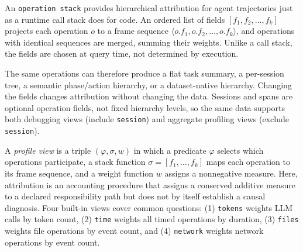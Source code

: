 \documentclass[letterpaper]{article}
\newcommand{\opstack}{\texttt{operation stack}\xspace}
\begin{document}
\label{sec:stacks}
An \opstack provides hierarchical attribution for agent trajectories just as
a runtime call stack does for code.
An ordered list of fields
$[f_1, f_2, \ldots, f_k]$ projects each operation $o$ to a frame
sequence $\langle o.f_1, o.f_2, \ldots, o.f_k \rangle$, and
operations with identical sequences are merged, summing their
weights.
Unlike a call stack, the fields are chosen at query time, not
determined by execution.

The same operations can therefore produce a flat task summary, a per-session
tree, a semantic phase/action hierarchy, or a dataset-native hierarchy.
Changing the fields changes attribution without changing the data.
Sessions and spans are optional operation fields, not fixed hierarchy levels,
so the same data supports both debugging views (include \texttt{session}) and
aggregate profiling views (exclude \texttt{session}).

A \emph{profile view} is a triple $(\varphi, \sigma, w)$ in which a predicate
$\varphi$ selects which operations participate, a stack function
$\sigma = [f_1, \ldots, f_k]$ maps each operation to its frame
sequence, and a weight function $w$ assigns a nonnegative measure.
Here, attribution is an accounting procedure that assigns a conserved additive
measure to a declared responsibility path but does not by itself establish a
causal diagnosis.
Four built-in views cover common questions: (1) \texttt{tokens} weights LLM
calls by token count, (2) \texttt{time} weights all timed operations by
duration, (3) \texttt{files} weights file operations by event count, and
(4) \texttt{network} weights network operations by event count.
\end{document}
